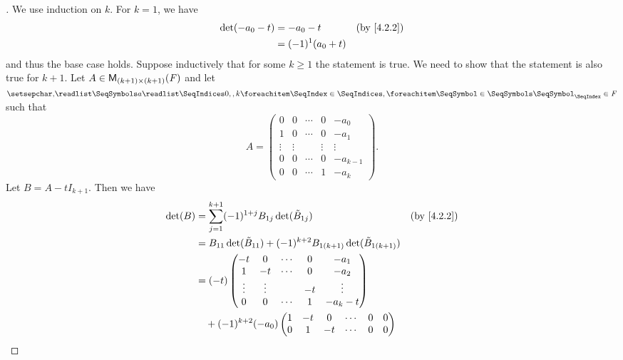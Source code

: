 \begin{proof}[]
	We use induction on \(k\).
	For \(k = 1\), we have
	\begin{align*}
		\det(-a_0 - t) & = -a_0 - t         &  & \by{4.2.2} \\
		               & = (-1)^1 (a_0 + t)
	\end{align*}
	and thus the base case holds.
	Suppose inductively that for some \(k \geq 1\) the statement is true.
	We need to show that the statement is also true for \(k + 1\).
	Let \(A \in \ms[(k + 1)][(k + 1)][\F]\) and let \(\seq{a}{0,,k} \in \F\) such that
	\[
		A = \begin{pmatrix}
			0      & 0      & \cdots & 0      & -a_0       \\
			1      & 0      & \cdots & 0      & -a_1       \\
			\vdots & \vdots &        & \vdots & \vdots     \\
			0      & 0      & \cdots & 0      & -a_{k - 1} \\
			0      & 0      & \cdots & 1      & -a_k
		\end{pmatrix}.
	\]
	Let \(B = A - t I_{k + 1}\).
	Then we have
	\begin{align*}
		\det(B) & = \sum_{j = 1}^{k + 1} (-1)^{1 + j} B_{1 j} \det(\tilde{B}_{1 j})                        &  & \by{4.2.2}                       \\
		        & = B_{1 1} \det(\tilde{B}_{1 1}) + (-1)^{k + 2} B_{1 (k + 1)} \det(\tilde{B}_{1 (k + 1)})                                       \\
		        & = (-t) \begin{pmatrix}
			                 -t     & 0      & \cdots & 0  & -a_1     \\
			                 1      & -t     & \cdots & 0  & -a_2     \\
			                 \vdots & \vdots &        & -t & \vdots   \\
			                 0      & 0      & \cdots & 1  & -a_k - t
		                 \end{pmatrix}                                                                                \\
		        & \quad + (-1)^{k + 2} (-a_0) \begin{pmatrix}
			                                      1      & -t     & 0      & \cdots & 0      & 0      \\
			                                      0      & 1      & -t     & \cdots & 0      & 0      \\

\end{pmatrix}
\end{align*}
\end{proof}
